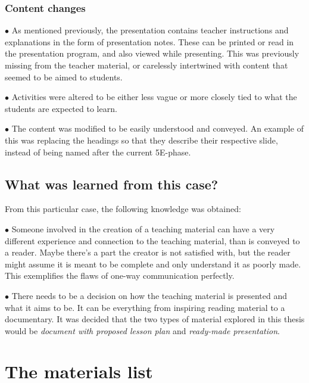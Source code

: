 \subsubsection*{Content changes}
\begin{description}
    \item $\bullet$ As mentioned previously, the presentation contains teacher instructions and explanations in the form of presentation notes. These can be printed or read in the presentation program, and also viewed while presenting. This was previously missing from the teacher material, or carelessly intertwined with content that seemed to be aimed to students.
    \item $\bullet$ Activities were altered to be either less vague or more closely tied to what the students are expected to learn.
    \item $\bullet$ The content was modified to be easily understood and conveyed. An example of this was replacing the headings so that they describe their respective slide, instead of being named after the current 5E-phase.
\end{description}
\subsection{What was learned from this case?}
From this particular case, the following knowledge was obtained:
\begin{description}
    \item $\bullet$ Someone involved in the creation of a teaching material can have a very different experience and connection to the teaching material, than is conveyed to a reader. Maybe there's a part the creator is not satisfied with, but the reader might assume it is meant to be complete and only understand it as poorly made. This exemplifies the flaws of one-way communication perfectly.
    \item $\bullet$ There needs to be a decision on how the teaching material is presented and what it aims to be. It can be everything from inspiring reading material to a documentary. It was decided that the two types of material explored in this thesis would be \textit{document with proposed lesson plan} and \textit{ready-made presentation}.
\end{description}

\section{The materials list}

